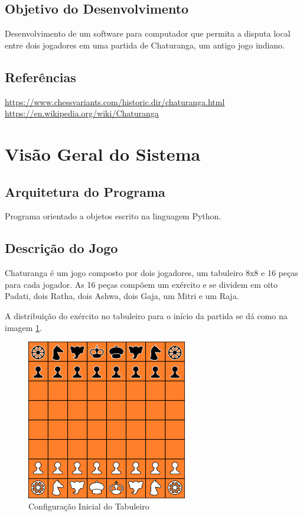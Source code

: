 \documentclass{article}
\begin{document}
\subsection{Objetivo do Desenvolvimento}
    Desenvolvimento de um software para computador que permita a disputa local entre dois jogadores em uma partida de Chaturanga, um antigo jogo indiano.

\subsection{Referências}
    \url{https://www.chessvariants.com/historic.dir/chaturanga.html} \\
    \url{https://en.wikipedia.org/wiki/Chaturanga} \\
    
\section{Visão Geral do Sistema}
\subsection{Arquitetura do Programa}
    Programa orientado a objetos escrito na linguagem Python.
    
\subsection{Descrição do Jogo}
    Chaturanga é um jogo composto por dois jogadores, um tabuleiro 8x8 e 16 peças para cada jogador.
    As 16 peças compõem um exército e se dividem em oito Padati, dois Ratha, dois Ashwa, dois Gaja, um Mitri e um Raja.
    
    A distribuição do exército no tabuleiro para o início da partida se dá como na imagem \ref{figura:initial_board}.
    
    \begin{figure}[h]
    \centering
    \includegraphics[width=7cm]{imgs/initial_board.png}
    \caption{Configuração Inicial do Tabuleiro}
    \label{figura:initial_board}
    \end{figure}
\end{document}
